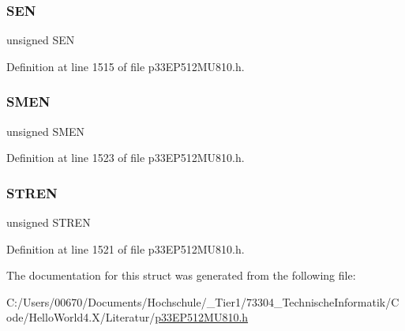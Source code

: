 \subsubsection{\texorpdfstring{S\+EN}{SEN}}
{\footnotesize\ttfamily unsigned S\+EN}



Definition at line 1515 of file p33\+E\+P512\+M\+U810.\+h.

\mbox{\label{structtag_i2_c1_c_o_n_b_i_t_s_a33a132b33aa2680e4316437c8fc45c4a}} 
\subsubsection{\texorpdfstring{S\+M\+EN}{SMEN}}
{\footnotesize\ttfamily unsigned S\+M\+EN}



Definition at line 1523 of file p33\+E\+P512\+M\+U810.\+h.

\mbox{\label{structtag_i2_c1_c_o_n_b_i_t_s_a815f4f81099ee6f7f25c4712495b47f9}} 
\subsubsection{\texorpdfstring{S\+T\+R\+EN}{STREN}}
{\footnotesize\ttfamily unsigned S\+T\+R\+EN}



Definition at line 1521 of file p33\+E\+P512\+M\+U810.\+h.



The documentation for this struct was generated from the following file\+:\begin{DoxyCompactItemize}
\item 
C\+:/\+Users/00670/\+Documents/\+Hochschule/\+\_\+\+Tier1/73304\+\_\+\+Technische\+Informatik/\+Code/\+Hello\+World4.\+X/\+Literatur/\hyperlink{p33_e_p512_m_u810_8h}{p33\+E\+P512\+M\+U810.\+h}\end{DoxyCompactItemize}
